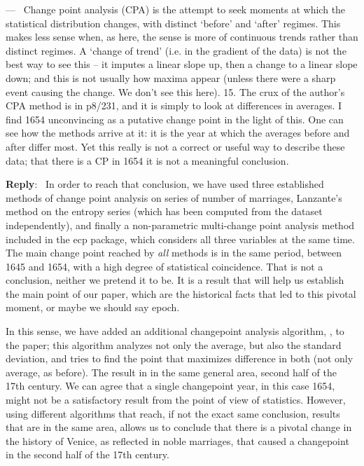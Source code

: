 \documentclass[11pt]{article}
\newcounter{reviewer}
\newcounter{point}[reviewer]
\renewcommand{\thepoint}{P\,\thereviewer.\arabic{point}}
\newenvironment{point}
   {\refstepcounter{point} \bigskip \noindent {\textbf{Reviewer~Point~\thepoint} } ---\ }
   {\par }
\newenvironment{reply}
   {\medskip \noindent \begin{sf}\textbf{Reply}:\  }
   {\medskip \end{sf}}
\begin{document}
\begin{point}
Change point analysis (CPA) is the attempt to seek moments at which
the statistical distribution changes, with distinct ‘before’ and ‘after’ regimes.
This makes less sense when, as here, the sense is more of continuous trends
rather than distinct regimes. A ‘change of trend’ (i.e. in the gradient of the
data) is not the best way to see this – it imputes a linear slope up, then a
change to a linear slope down; and this is not usually how maxima appear
(unless there were a sharp event causing the change. We don’t see this here).
15. The crux of the author’s CPA method is in p8/231, and it is simply
to look at differences in averages. I find 1654 unconvincing as a putative
change point in the light of this. One can see how the methods arrive at it:
it is the year at which the averages before and after differ most. Yet this
really is not a correct or useful way to describe these data; that there is a
CP in 1654 it is not a meaningful conclusion.
\end{point}

\begin{reply}
In order to reach that conclusion, we have used three established methods of
change point analysis on series of number of marriages, Lanzante's method on the
entropy series (which has been computed from the dataset independently), and
finally a non-parametric multi-change point analysis method included in the {\sf
  ecp} package, which considers all three variables at the same time. The main
change point reached by {\em all} methods is in the same period, between 1645
and 1654, with a high degree of statistical coincidence. That is not a
conclusion, neither we pretend it to be. It is a result that will help us
establish the main point of our paper, which are the historical facts that led
to this pivotal moment, or maybe we should say epoch.

In this sense, we have added an additional changepoint analysis algorithm,
\cite{killick}, to the paper; this algorithm analyzes not only the average, but
also the standard deviation, and tries to find the point that maximizes
difference in both (not only average, as before). The result in in the same general area, second
half of the 17th century. We can agree that a single changepoint year, in this
case 1654, might not be a satisfactory result from the point of view of
statistics. However, using different algorithms that reach, if not the exact
same conclusion, results that are in the same area, allows us to conclude that
there is a pivotal change in the history of Venice, as reflected in noble
marriages, that caused a changepoint in the second half of the 17th century.
\end{reply}
\end{document}
